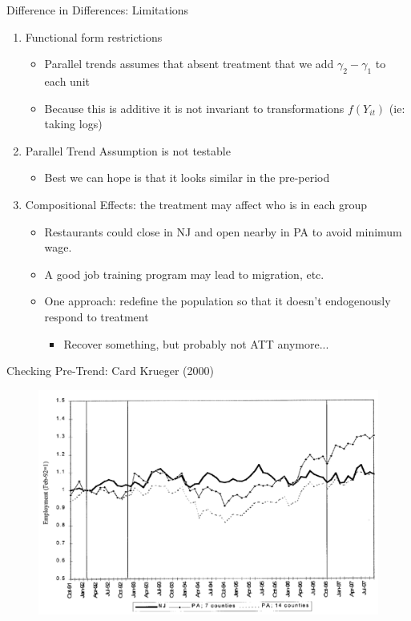 \documentclass[xcolor=pdftex,dvipsnames,table,mathserif,aspectratio=169]{beamer}
\begin{document}
\begin{frame}{Difference in Differences: Limitations}
\begin{enumerate}
\item Functional form restrictions
\begin{itemize}
\item \alert{Parallel trends} assumes that absent treatment that we add $\gamma_2 - \gamma_1$ to each unit
\item Because this is \alert{additive} it is not invariant to transformations $f(Y_{it})$ (ie: taking logs)
\end{itemize}
\item Parallel Trend Assumption is \alert{not testable}
\begin{itemize}
\item Best we can hope is that it looks similar in the pre-period
\end{itemize}
\item Compositional Effects: the treatment may affect who is in each group
\begin{itemize}
\item Restaurants could close in NJ and open nearby in PA to avoid minimum wage.
\item A good job training program may lead to migration, etc.
\item One approach: redefine the population so that it doesn't endogenously respond to treatment
\begin{itemize}
\item Recover something, but probably not ATT anymore...
\end{itemize}

\end{itemize}

\end{enumerate}

\end{frame}

\begin{frame}{Checking Pre-Trend: Card Krueger (2000)}
\begin{figure}
\centering
\includegraphics[width=4.5in]{./resources/card_krueger_2000.png}
\end{figure}
\end{frame}
\end{document}
